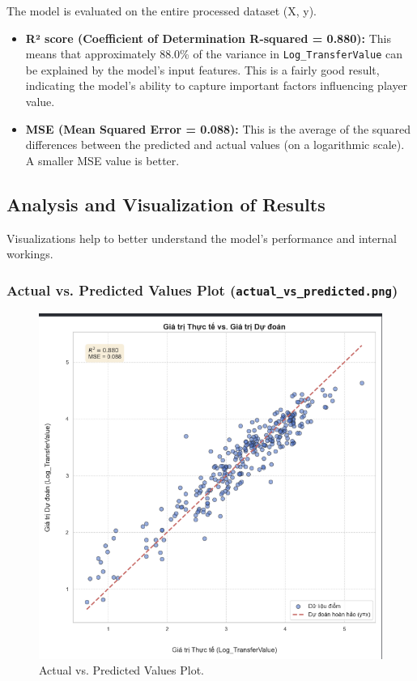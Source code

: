 \documentclass[12pt, a4paper]{report}
\begin{document}
The model is evaluated on the entire processed dataset (X, y).
\begin{itemize}
    \item \textbf{R² score (Coefficient of Determination R-squared = 0.880):} This means that approximately 88.0\% of the variance in \texttt{Log\_TransferValue} can be explained by the model's input features. This is a fairly good result, indicating the model's ability to capture important factors influencing player value.
    \item \textbf{MSE (Mean Squared Error = 0.088):} This is the average of the squared differences between the predicted and actual values (on a logarithmic scale). A smaller MSE value is better.
\end{itemize}

\subsection{Analysis and Visualization of Results}

Visualizations help to better understand the model's performance and internal workings.

\subsubsection*{Actual vs. Predicted Values Plot (\texttt{actual\_vs\_predicted.png})}
\begin{figure}[H]
    \centering
    \includegraphics[width=\textwidth]{actual_vs_predicted.png}
    \caption{Actual vs. Predicted Values Plot.}
    \label{fig:actual_vs_predicted}
\end{figure}
\end{document}
